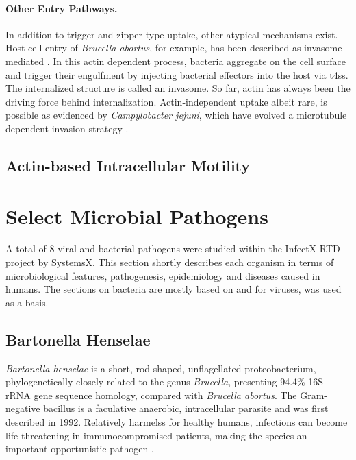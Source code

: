 
\paragraph{Other Entry Pathways.}
In addition to trigger and zipper type uptake, other atypical mechanisms exist. Host cell entry of \textit{Brucella abortus}, for example, has been described as invasome mediated \citep{Dehio2005}. In this actin dependent process, bacteria aggregate on the cell surface and trigger their engulfment by injecting bacterial effectors into the host via \gls{t4ss}. The internalized structure is called an invasome. So far, actin has always been the driving force behind internalization. Actin-independent uptake albeit rare, is possible as evidenced by \textit{Campylobacter jejuni}, which have evolved a microtubule dependent invasion strategy \citep{Kopecko2001}.

\subsection{Actin-based Intracellular Motility}

\section{Select Microbial Pathogens}

A total of 8 viral and bacterial pathogens were studied within the InfectX RTD project by SystemsX. This section shortly describes each organism in terms of microbiological features, pathogenesis, epidemiology and diseases caused in humans. The sections on bacteria are mostly based on \cite{Rolain2006} and for viruses, \cite{Craighead2000} was used as a basis.

\subsection{Bartonella Henselae}

\textit{Bartonella henselae} is a short, rod shaped, unflagellated proteobacterium, phylogenetically closely related to the genus \textit{Brucella}, presenting 94.4\% 16S rRNA gene sequence homology, compared with \textit{Brucella abortus}. The Gram-negative bacillus is a faculative anaerobic, intracellular parasite and was first described in 1992. Relatively harmelss for healthy humans, infections can become life threatening in immunocompromised patients, making the species an important opportunistic pathogen \citep{Anderson1997}.

